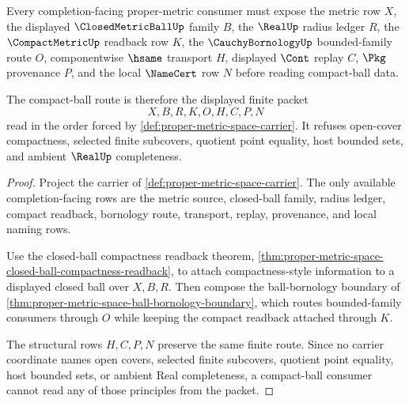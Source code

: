 \begin{theorem}
\label{thm:proper-metric-space-compact-ball-route}
Every completion-facing proper-metric consumer must expose the metric row $X$, the displayed $\ClosedMetricBallUp$ family $B$, the $\RealUp$ radius ledger $R$, the $\CompactMetricUp$ readback row $K$, the $\CauchyBornologyUp$ bounded-family route $O$, componentwise $\hsame$ transport $H$, displayed $\Cont$ replay $C$, $\Pkg$ provenance $P$, and the local $\NameCert$ row $N$ before reading compact-ball data.

The compact-ball route is therefore the displayed finite packet
$$
X,B,R,K,O,H,C,P,N
$$
read in the order forced by \autoref{def:proper-metric-space-carrier}. It refuses open-cover compactness, selected finite subcovers, quotient point equality, host bounded sets, and ambient $\RealUp$ completeness.
\end{theorem}
\begin{proof}
Project the carrier of \autoref{def:proper-metric-space-carrier}. The only available completion-facing rows are the metric source, closed-ball family, radius ledger, compact readback, bornology route, transport, replay, provenance, and local naming rows.

Use the closed-ball compactness readback theorem, \autoref{thm:proper-metric-space-closed-ball-compactness-readback}, to attach compactness-style information to a displayed closed ball over $X,B,R$. Then compose the ball-bornology boundary of \autoref{thm:proper-metric-space-ball-bornology-boundary}, which routes bounded-family consumers through $O$ while keeping the compact readback attached through $K$.

The structural rows $H,C,P,N$ preserve the same finite route. Since no carrier coordinate names open covers, selected finite subcovers, quotient point equality, host bounded sets, or ambient Real completeness, a compact-ball consumer cannot read any of those principles from the packet.
\end{proof}



